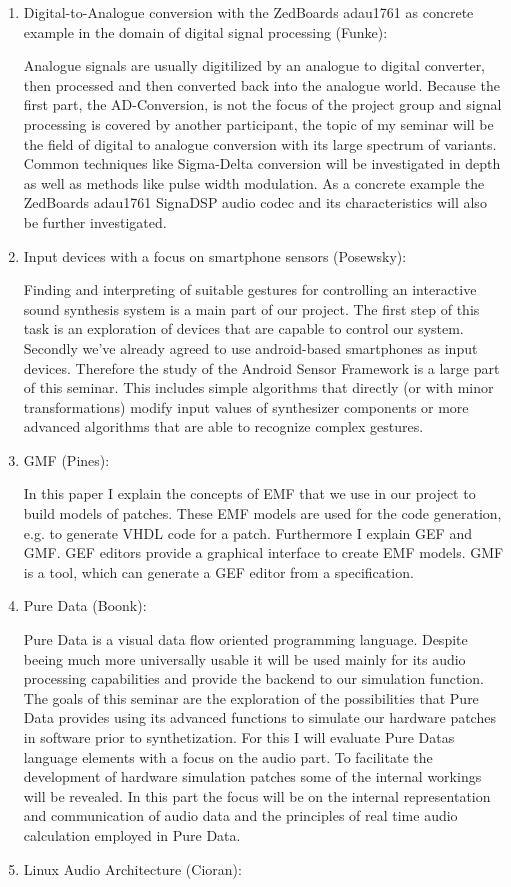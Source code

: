 \begin{enumerate}
	\item Digital-to-Analogue conversion with the ZedBoards adau1761 as concrete example in the domain of digital signal processing (Funke):
	
	Analogue signals are usually digitilized by an analogue to digital converter, then processed and then converted back into the analogue world. Because the first part, the AD-Conversion, is not the focus of the project group and signal processing is covered by another participant, the topic of my seminar will be the field of digital to analogue conversion with its large spectrum of variants. Common techniques like Sigma-Delta conversion will be investigated in depth as well as methods like pulse width modulation. As a concrete example the ZedBoards adau1761 SignaDSP audio codec and its characteristics will also be further investigated.
	\item Input devices with a focus on smartphone sensors (Posewsky):
	
	Finding and interpreting of suitable gestures for controlling an interactive sound synthesis system is a main part of our project. The first step of this task is an exploration of devices that are capable to control our system. Secondly we've already agreed to use android-based smartphones as input devices. Therefore the study of the Android Sensor Framework is a large part of this seminar. This includes simple algorithms that directly (or with minor transformations) modify input values of synthesizer components or more advanced algorithms that are able to recognize complex gestures.
	\item GMF (Pines):
	
	In this paper I explain the concepts of \ac{EMF} that we use in our project to build models of patches. These \ac{EMF} models are used for the code generation, e.g. to generate \ac{VHDL} code for a patch. Furthermore I explain \ac{GEF} and \ac{GMF}. \ac{GEF} editors provide a graphical interface to create \ac{EMF} models. \ac{GMF} is a tool, which can generate a \ac{GEF} editor from a specification.
	\item Pure Data (Boonk):
	
	Pure Data is a visual data flow oriented programming language. Despite beeing much more universally usable it will be used mainly for its audio processing capabilities and provide the backend to our simulation function. The goals of this seminar are the exploration of the possibilities that Pure Data provides using its advanced functions to simulate our hardware patches in software prior to synthetization. For this I will evaluate Pure Datas language elements with a focus on the audio part. To facilitate the development of hardware simulation patches some of the internal workings will be revealed. In this part the focus will be on the internal representation and communication of audio data and the principles of real time audio calculation employed in Pure Data.
	\item Linux Audio Architecture (Cioran):
	

\end{enumerate}
